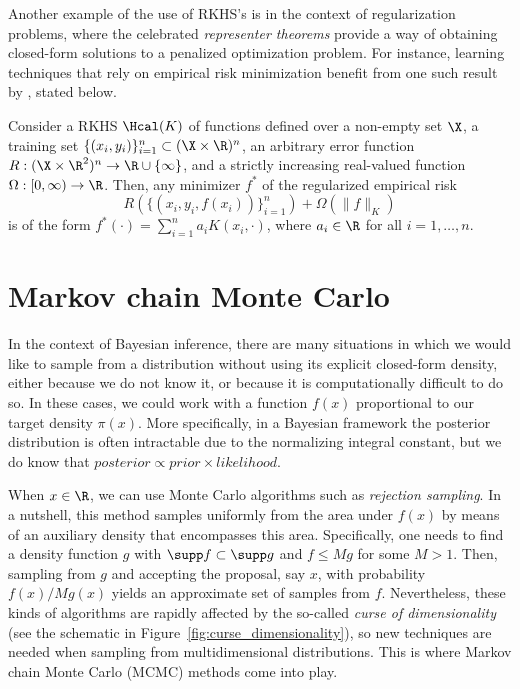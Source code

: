 Another example of the use of RKHS's is in the context of regularization problems, where the celebrated \textit{representer theorems} provide a way of obtaining closed-form solutions to a penalized optimization problem. For instance, learning techniques that rely on empirical risk minimization \citep[e.g.][]{vapnik1991principles} benefit from one such result by \citet{scholkopf2001generalized}, stated below.

\begin{theorem}
  Consider a RKHS \(\Hcal(K)\) of functions defined over a non-empty set \(\X\), a training set \(\{(x_i, y_i)\}_{i=1}^n \subset (\X \times \R)^n\), an arbitrary error function \(R: (\X  \times \R^2)^n \to \R\cup\{\infty\}\), and a strictly increasing real-valued function \(\Omega:[0,\infty)\to \R\). Then, any minimizer \(f^\ast\) of the regularized empirical risk
  \[
    R(\{(x_i, y_i, f(x_i))\}_{i=1}^n) + \Omega(\|f\|_K)
  \]
  is of the form \(f^\ast(\cdot) = \sum_{i=1}^n a_i K(x_i, \cdot)\), where \(a_i\in\R\) for all \(i=1,\dots,n\).
\end{theorem}

\section{Markov chain Monte Carlo}\label{sec:mcmc}

In the context of Bayesian inference, there are many situations in which we would like to sample from a distribution without using its explicit closed-form density, either because we do not know it, or because it is computationally difficult to do so. In these cases, we could work with a function \(f(x)\) proportional to our target density \(\pi(x)\). More specifically, in a Bayesian framework the posterior distribution is often intractable due to the normalizing integral constant, but we do know that \(posterior \propto prior \times likelihood\).

When \(x\in\R\), we can use Monte Carlo algorithms such as \textit{rejection sampling}. In a nutshell, this method samples uniformly from the area under \(f(x)\) by means of an auxiliary density that encompasses this area. Specifically, one needs to find a density function \(g\) with \(\supp f \subset \supp g\) and \(f \leq Mg\) for some \(M>1\). Then, sampling from \(g\) and accepting the proposal, say \(x\), with probability \(f(x)/Mg(x)\) yields an approximate set of samples from \(f\). Nevertheless, these kinds of algorithms are rapidly affected by the so-called \textit{curse of dimensionality} (see the schematic in Figure~\ref{fig:curse_dimensionality}), so new techniques are needed when sampling from multidimensional distributions. This is where Markov chain Monte Carlo (MCMC) methods come into play.

